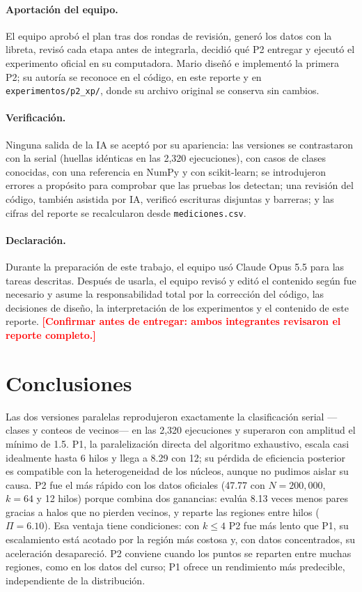 \documentclass[11pt,letterpaper]{article}
\newcommand{\code}[1]{\texttt{#1}}
\newcommand{\pendiente}[1]{\textcolor{red}{\textbf{[#1]}}}
\begin{document}
\paragraph{Aportación del equipo.} El equipo aprobó el plan tras dos rondas de revisión, generó los datos con la
libreta, revisó cada etapa antes de integrarla, decidió qué P2 entregar y ejecutó el experimento oficial en su
computadora. Mario diseñó e implementó la primera P2; su autoría se reconoce en el código, en este reporte y en
\code{experimentos/p2\_xp/}, donde su archivo original se conserva sin cambios.

\paragraph{Verificación.} Ninguna salida de la IA se aceptó por su apariencia: las versiones se contrastaron con la
serial (huellas idénticas en las 2,320 ejecuciones), con casos de clases conocidas, con una referencia en NumPy y con
scikit-learn; se introdujeron errores a propósito para comprobar que las pruebas los detectan; una revisión del
código, también asistida por IA, verificó escrituras disjuntas y barreras; y las cifras del reporte se recalcularon
desde \code{mediciones.csv}.

\paragraph{Declaración.} Durante la preparación de este trabajo, el equipo usó Claude Opus 5.5 para las tareas
descritas. Después de usarla, el equipo revisó y editó el contenido según fue necesario y asume la responsabilidad
total por la corrección del código, las decisiones de diseño, la interpretación de los experimentos y el contenido
de este reporte. \pendiente{Confirmar antes de entregar: ambos integrantes revisaron el reporte completo.}

\section{Conclusiones}\label{sec:conclusion}

Las dos versiones paralelas reprodujeron exactamente la clasificación serial ---clases y conteos de vecinos--- en las
2,320 ejecuciones y superaron con amplitud el mínimo de 1.5. P1, la paralelización directa del algoritmo exhaustivo,
escala casi idealmente hasta 6 hilos y llega a 8.29 con 12; su pérdida de eficiencia posterior es compatible con la
heterogeneidad de los núcleos, aunque no pudimos aislar su causa. P2 fue el más rápido con los datos oficiales
(47.77 con $N=200{,}000$, $k=64$ y 12 hilos) porque combina dos ganancias: evalúa 8.13 veces menos pares gracias a
halos que no pierden vecinos, y reparte las regiones entre hilos ($\Pi=6.10$). Esa ventaja tiene condiciones: con
$k\le4$ P2 fue más lento que P1, su escalamiento está acotado por la región más costosa y, con datos concentrados,
su aceleración desapareció. P2 conviene cuando los puntos se reparten entre muchas regiones, como en los datos del
curso; P1 ofrece un rendimiento más predecible, independiente de la distribución.
\end{document}
